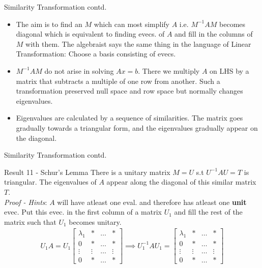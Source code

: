 \documentclass{beamer}
\begin{document}
\begin{frame}{Similarity Transformation contd.}
\begin{itemize}
    \item The aim is to find an $M$ which can most simplify $A$ i.e. $M^{-1}AM$ becomes diagonal which is equivalent to finding evecs. of $A$ and fill in the columns of $M$ with them. The algebraist says the same thing in the language of Linear Transformation: Choose a basis consisting of evecs.
    \item $M^{-1}AM$ do not arise in solving $Ax=b$. There we multiply $A$ on LHS by a matrix that subtracts a multiple of one row from another. Such a transformation preserved null space and row space but normally changes eigenvalues.
    \item Eigenvalues are calculated by a sequence of similarities. The matrix goes gradually towards a triangular form, and the eigenvalues gradually appear on the diagonal.
\end{itemize}
\end{frame}

\begin{frame}{Similarity Transformation contd.}
\begin{block}{Result 11 - Schur's Lemma}
There is a unitary matrix $M=U$ s.t $U^{-1}AU = T$ is triangular. The eigenvalues of $A$ appear along the diagonal of this similar matrix $T$.\\
\textit{Proof - Hints}: $A$ will have atleast one eval. and therefore has atleast one \textbf{unit} evec. Put this evec. in the first column of a matrix $U_1$ and fill the rest of the matrix such that $U_1$ becomes unitary.
\begin{align*}
    U_1A = U_1\begin{bmatrix}\lambda_1&*&\ldots&*\\0&*&\ldots&*\\\vdots&\vdots&\ldots&\vdots\\0&*&\ldots&*\end{bmatrix} \implies U_1^{-1}AU_1 = \begin{bmatrix}\lambda_1&*&\ldots&*\\0&*&\ldots&*\\\vdots&\vdots&\ldots&\vdots\\0&*&\ldots&*\end{bmatrix}
\end{align*}
\end{block}
\end{frame}
\end{document}
